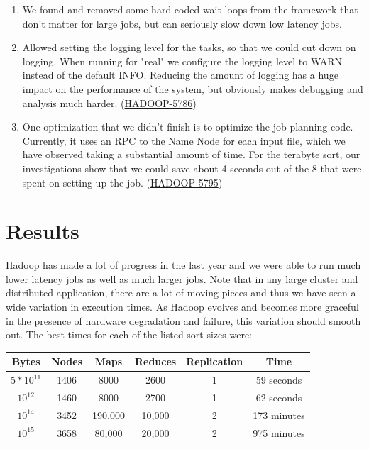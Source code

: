 \documentclass{article}
\begin{document}
\begin{enumerate}
\item We found and removed some hard-coded wait loops from the
  framework that don't matter for large jobs, but can seriously slow
  down low latency jobs.

\item Allowed setting the logging level for the tasks, so that we
  could cut down on logging. When running for "real" we configure the
  logging level to WARN instead of the default INFO. Reducing the
  amount of logging has a huge impact on the performance of the
  system, but obviously makes debugging and analysis much harder.
  (\href{http://issues.apache.org/jira/browse/HADOOP-5786}{HADOOP-5786})

\item One optimization that we didn't finish is to optimize the job
  planning code. Currently, it uses an RPC to the Name Node for each
  input file, which we have observed taking a substantial amount of
  time. For the terabyte sort, our investigations show that we
  could save about 4 seconds out of the 8 that were spent on setting
  up the job.
  (\href{http://issues.apache.org/jira/browse/HADOOP-5795}{HADOOP-5795})

\end{enumerate}

\section{Results}

Hadoop has made a lot of progress in the last year and we were able to
run much lower latency jobs as well as much larger jobs. Note that in
any large cluster and distributed application, there are a lot of
moving pieces and thus we have seen a wide variation in execution
times. As Hadoop evolves and becomes more graceful in the presence of
hardware degradation and failure, this variation should smooth
out. The best times for each of the listed sort sizes were:
\\

\begin{tabular}{| c | c | c | c | c | c |}
\hline
Bytes & Nodes & Maps & Reduces & Replication & Time \\
\hline
$5*10^{11}$ & 1406 & 8000 & 2600 & 1 & 59 seconds \\
$10^{12}$ & 1460 & 8000 & 2700 & 1 & 62 seconds \\
$10^{14}$ & 3452 & 190,000 & 10,000 & 2 & 173 minutes \\
$10^{15}$ & 3658 & 80,000 & 20,000 & 2 & 975 minutes \\
\hline
\end{tabular}\\
\end{document}

